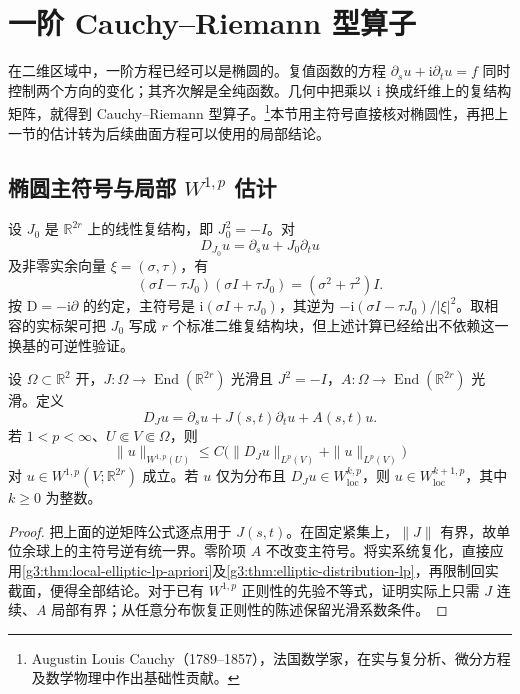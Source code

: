 
% 
% 

\section{一阶 Cauchy–Riemann 型算子}
\label{g3:sec:1206}

在二维区域中，一阶方程已经可以是椭圆的。复值函数的方程 \(\partial_su+\mathrm i\partial_tu=f\) 同时控制两个方向的变化；其齐次解是全纯函数。几何中把乘以 \(\mathrm i\) 换成纤维上的复结构矩阵，就得到 Cauchy--Riemann 型算子。\footnote{Augustin Louis Cauchy（1789--1857），法国数学家，在实与复分析、微分方程及数学物理中作出基础性贡献。}本节用主符号直接核对椭圆性，再把上一节的估计转为后续曲面方程可以使用的局部结论。

\subsection{\texorpdfstring{椭圆主符号与局部 \(W^{1,p}\) 估计}{椭圆主符号与局部 W¹ᵖ 估计}}
\label{g3:subsec:1206:01}
设 \(J_0\) 是 \(\mathbb R^{2r}\) 上的线性复结构，即 \(J_0^2=-I\)。对
\[
	D_{J_0}u=\partial_su+J_0\partial_tu
\]
及非零实余向量 \(\xi=(\sigma,\tau)\)，有
\[
	(\sigma I-\tau J_0)(\sigma I+\tau J_0)=(\sigma^2+\tau^2)I.
\]
按 \(\mathrm D=-\mathrm i\partial\) 的约定，主符号是 \(\mathrm i(\sigma I+\tau J_0)\)，其逆为 \(-\mathrm i(\sigma I-\tau J_0)/|\xi|^2\)。取相容的实标架可把 \(J_0\) 写成 \(r\) 个标准二维复结构块，但上述计算已经给出不依赖这一换基的可逆性验证。

\begin{theorem}\label{g3:thm:cr-local-w1p}
	设 \(\Omega\subset\mathbb R^2\) 开，\(J:\Omega\to\operatorname{End}(\mathbb R^{2r})\) 光滑且 \(J^2=-I\)，\(A:\Omega\to\operatorname{End}(\mathbb R^{2r})\) 光滑。定义
	\[
		D_Ju=\partial_su+J(s,t)\partial_tu+A(s,t)u.
	\]
	若 \(1<p<\infty\)、\(U\Subset V\Subset\Omega\)，则
	\[
		\|u\|_{W^{1,p}(U)}\le C\bigl(\|D_Ju\|_{L^p(V)}+\|u\|_{L^p(V)}\bigr)
	\]
	对 \(u\in W^{1,p}(V;\mathbb R^{2r})\) 成立。若 \(u\) 仅为分布且 \(D_Ju\in W^{k,p}_{\mathrm{loc}}\)，则 \(u\in W^{k+1,p}_{\mathrm{loc}}\)，其中 \(k\ge0\) 为整数。
\end{theorem}
\begin{proof}
	把上面的逆矩阵公式逐点用于 \(J(s,t)\)。在固定紧集上，\(\|J\|\) 有界，故单位余球上的主符号逆有统一界。零阶项 \(A\) 不改变主符号。将实系统复化，直接应用\cref{g3:thm:local-elliptic-lp-apriori}及\cref{g3:thm:elliptic-distribution-lp}，再限制回实截面，便得全部结论。对于已有 \(W^{1,p}\) 正则性的先验不等式，证明实际上只需 \(J\) 连续、\(A\) 局部有界；从任意分布恢复正则性的陈述保留光滑系数条件。
\end{proof}

